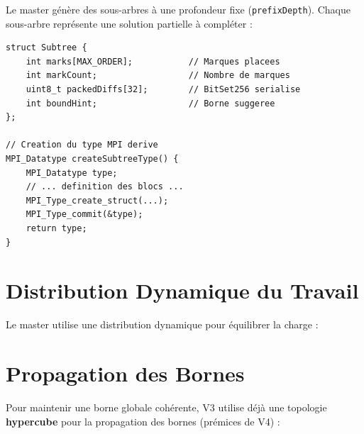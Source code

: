 \documentclass[12pt,a4paper,twoside]{report}
\begin{document}
Le master génère des sous-arbres à une profondeur fixe (\texttt{prefixDepth}). Chaque sous-arbre représente une solution partielle à compléter :

\begin{lstlisting}[caption={Structure d'un sous-arbre}]
struct Subtree {
    int marks[MAX_ORDER];           // Marques placees
    int markCount;                  // Nombre de marques
    uint8_t packedDiffs[32];        // BitSet256 serialise
    int boundHint;                  // Borne suggeree
};

// Creation du type MPI derive
MPI_Datatype createSubtreeType() {
    MPI_Datatype type;
    // ... definition des blocs ...
    MPI_Type_create_struct(...);
    MPI_Type_commit(&type);
    return type;
}
\end{lstlisting}

\section{Distribution Dynamique du Travail}

Le master utilise une distribution dynamique pour équilibrer la charge :

\begin{algorithm}[htbp]
\SetAlgoLined
{}




\caption{Distribution dynamique Master/Worker}
\end{algorithm}

\section{Propagation des Bornes}

Pour maintenir une borne globale cohérente, V3 utilise déjà une topologie \textbf{hypercube} pour la propagation des bornes (prémices de V4) :
\end{document}
